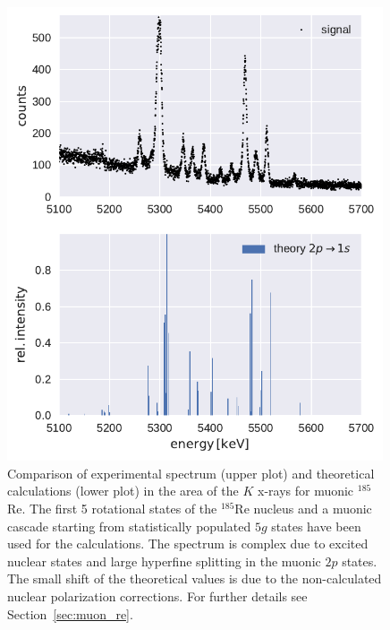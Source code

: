 \begin{figure}%
\centering
\includegraphics[width=0.99\textwidth]{pics/comparison_21}
\caption{
Comparison of experimental spectrum (upper plot) and theoretical calculations (lower plot) in the area of the $K$ x-rays for muonic $^{185}$Re. The first 5 rotational states of the $^{185}$Re nucleus and a muonic cascade starting from statistically populated $5g$ states have been used for the calculations. The spectrum is complex due to excited nuclear states and large hyperfine splitting in the muonic $2p$ states. The small shift of the theoretical values is due to the non-calculated nuclear polarization corrections. For further details see Section~\ref{sec:muon_re}.
}
\label{fig:re54_K}
\end{figure}
%
%
%
\clearpage
